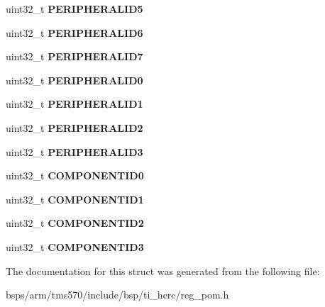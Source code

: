 \begin{DoxyCompactItemize}
uint32\+\_\+t {\bfseries P\+E\+R\+I\+P\+H\+E\+R\+A\+L\+I\+D5}
\item 
\mbox{\label{structtms570__pom__t_aa36edc39c0c655400bf9e7b727e5e251}} 
uint32\+\_\+t {\bfseries P\+E\+R\+I\+P\+H\+E\+R\+A\+L\+I\+D6}
\item 
\mbox{\label{structtms570__pom__t_af80077c1994614fe84c21cf28d92697d}} 
uint32\+\_\+t {\bfseries P\+E\+R\+I\+P\+H\+E\+R\+A\+L\+I\+D7}
\item 
\mbox{\label{structtms570__pom__t_a56d62ce89e416e9f4ba1fa5bbd65c359}} 
uint32\+\_\+t {\bfseries P\+E\+R\+I\+P\+H\+E\+R\+A\+L\+I\+D0}
\item 
\mbox{\label{structtms570__pom__t_ab2e8e2d7344955d579fcd6d9089502e7}} 
uint32\+\_\+t {\bfseries P\+E\+R\+I\+P\+H\+E\+R\+A\+L\+I\+D1}
\item 
\mbox{\label{structtms570__pom__t_a8a6fe957a8e06ced500519b99c531120}} 
uint32\+\_\+t {\bfseries P\+E\+R\+I\+P\+H\+E\+R\+A\+L\+I\+D2}
\item 
\mbox{\label{structtms570__pom__t_ab2e5bd8e0ae04b1d058c228f8d7a769f}} 
uint32\+\_\+t {\bfseries P\+E\+R\+I\+P\+H\+E\+R\+A\+L\+I\+D3}
\item 
\mbox{\label{structtms570__pom__t_a76f090e78453595d3efbf476e7530385}} 
uint32\+\_\+t {\bfseries C\+O\+M\+P\+O\+N\+E\+N\+T\+I\+D0}
\item 
\mbox{\label{structtms570__pom__t_abdc82386796093cfe8772adda5e2bc28}} 
uint32\+\_\+t {\bfseries C\+O\+M\+P\+O\+N\+E\+N\+T\+I\+D1}
\item 
\mbox{\label{structtms570__pom__t_a8315f2999c3326027198267ff5d53169}} 
uint32\+\_\+t {\bfseries C\+O\+M\+P\+O\+N\+E\+N\+T\+I\+D2}
\item 
\mbox{\label{structtms570__pom__t_a900d83630be8a600d26fd29f41b16cea}} 
uint32\+\_\+t {\bfseries C\+O\+M\+P\+O\+N\+E\+N\+T\+I\+D3}
\end{DoxyCompactItemize}


The documentation for this struct was generated from the following file\+:\begin{DoxyCompactItemize}
\item 
bsps/arm/tms570/include/bsp/ti\+\_\+herc/reg\+\_\+pom.\+h\end{DoxyCompactItemize}
